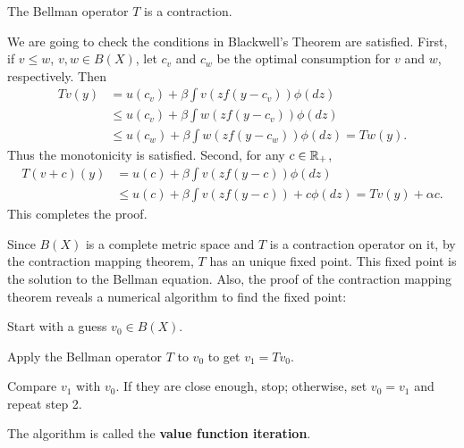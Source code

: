 \documentclass[12pt]{article}
\begin{document}
\begin{corollary}
    The Bellman operator $T$ is a contraction.
\end{corollary}
\begin{pf}
    We are going to check the conditions in Blackwell's Theorem are 
    satisfied. First, if $v\leq w$, $v,w\in B(X)$, let $c_v$ and 
    $c_w$ be the optimal consumption for $v$ and $w$, respectively. 
    Then 
    \begin{equation}
        \begin{split}
            Tv(y) 
            &= u(c_v) + \beta\int v(zf(y-c_v))\phi(dz)\\
            &\leq u(c_v) + \beta\int w(zf(y-c_v))\phi(dz)\\
            &\leq u(c_w) + \beta\int w(zf(y-c_w))\phi(dz) = Tw(y).
        \end{split}
    \end{equation} 
    Thus the monotonicity is satisfied. Second, for any $c\in\mathbb{R}_+$, 
    \begin{equation}
        \begin{split}
            T(v+c)(y) 
            &= u(c) + \beta\int v(zf(y-c))\phi(dz)\\
            &\leq u(c) + \beta\int v(zf(y-c))+c \phi(dz)
            = Tv(y) + \alpha c.
        \end{split}
    \end{equation}
    This completes the proof.
\end{pf}

Since $B(X)$ is a complete metric space and $T$ is a contraction 
operator on it, by the contraction mapping theorem, $T$ has an 
unique fixed point. This fixed point is the solution to the 
Bellman equation. Also, the proof of the contraction mapping 
theorem reveals a numerical algorithm to find the fixed point:
\begin{thmenum}
    \item Start with a guess $v_0\in B(X)$.
    \item Apply the Bellman operator $T$ to $v_0$ to get $v_1 = 
    Tv_0$. 
    \item Compare $v_1$ with $v_0$. If they are close enough, 
    stop; otherwise, set $v_0 = v_1$ and repeat step 2.
\end{thmenum} 
The algorithm is called the \textbf{value function iteration}. 
\end{document}
